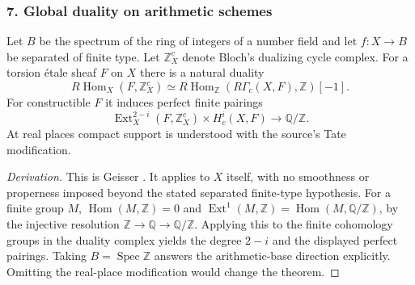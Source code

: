 \subsubsection{7. Global duality on arithmetic schemes}
\begin{theorem}\label{B:subject7}
Let $B$ be the spectrum of the ring of integers of a number field and let $f:X\to B$ be separated of finite type. Let $\mathbb Z_X^c$ denote Bloch's dualizing cycle complex. For a torsion \'etale sheaf $F$ on $X$ there is a natural duality
\[
 R\operatorname{Hom}_X(F,\mathbb Z_X^c)
 \simeq R\operatorname{Hom}_{\mathbb Z}(R\Gamma_c(X,F),\mathbb Z)[-1].
\]
For constructible $F$ it induces perfect finite pairings
\[
 \operatorname{Ext}^{2-i}_X(F,\mathbb Z_X^c)\times H_c^i(X,F)
 \longrightarrow\mathbb Q/\mathbb Z.
\]
At real places compact support is understood with the source's Tate modification.
\end{theorem}
\begin{proof}[Derivation]
This is Geisser \cite[Theorem 7.8]{BGeisser2010}. It applies to $X$ itself, with no smoothness or properness imposed beyond the stated separated finite-type hypothesis. For a finite group $M$, $\operatorname{Hom}(M,\mathbb Z)=0$ and $\operatorname{Ext}^1(M,\mathbb Z)=\operatorname{Hom}(M,\mathbb Q/\mathbb Z)$, by the injective resolution $\mathbb Z\to\mathbb Q\to\mathbb Q/\mathbb Z$. Applying this to the finite cohomology groups in the duality complex yields the degree $2-i$ and the displayed perfect pairings. Taking $B=\operatorname{Spec}\mathbb Z$ answers the arithmetic-base direction explicitly. Omitting the real-place modification would change the theorem.
\end{proof}

